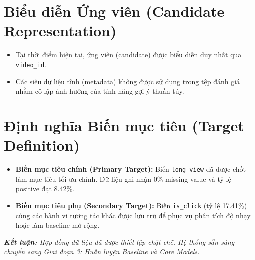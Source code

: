 \documentclass[12pt,a4paper]{article}
\begin{document}
\section{Biểu diễn Ứng viên (Candidate Representation)}
\begin{itemize}
    \item Tại thời điểm hiện tại, ứng viên (candidate) được biểu diễn duy nhất qua \texttt{video\_id}.
    \item Các siêu dữ liệu tĩnh (metadata) không được sử dụng trong tệp đánh giá nhằm cô lập ảnh hưởng của tính năng gợi ý thuần túy.
\end{itemize}

\section{Định nghĩa Biến mục tiêu (Target Definition)}
\begin{itemize}
    \item \textbf{Biến mục tiêu chính (Primary Target):} Biến \texttt{long\_view} đã được chốt làm mục tiêu tối ưu chính. Dữ liệu ghi nhận 0\% missing value và tỷ lệ positive đạt 8.42\%.
    \item \textbf{Biến mục tiêu phụ (Secondary Target):} Biến \texttt{is\_click} (tỷ lệ 17.41\%) cùng các hành vi tương tác khác được lưu trữ để phục vụ phân tích độ nhạy hoặc làm baseline mở rộng.
\end{itemize}

\vspace{20pt}
\noindent\textit{\textbf{Kết luận:} Hợp đồng dữ liệu đã được thiết lập chặt chẽ. Hệ thống sẵn sàng chuyển sang Giai đoạn 3: Huấn luyện Baseline và Core Models.}
\end{document}
